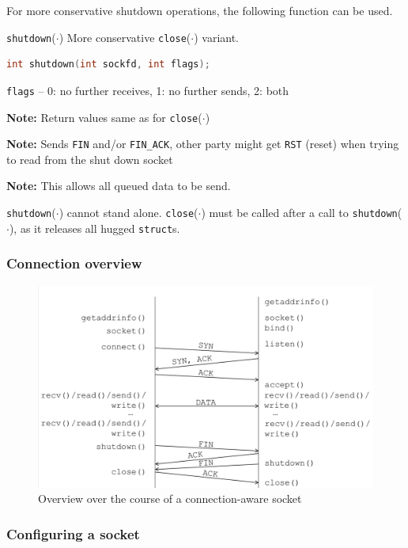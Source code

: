 \documentclass[english]{panikzettel}
\newcommand{\fkt}[1]{\texttt{#1}(\(\cdot\))}
\begin{document}
	For more conservative shutdown operations, the following function can be used.

	\begin{defi}{\fkt{shutdown}}
		More conservative \fkt{close} variant.
		\begin{lstlisting}[language=C]
			int shutdown(int sockfd, int flags);
		\end{lstlisting}
		\tcblower
		\texttt{flags} – 0: no further receives, 1: no further sends, 2: both

		\textbf{Note:} Return values same as for \fkt{close}

		\textbf{Note:} Sends \texttt{FIN} and/or \texttt{FIN\_ACK}, other party might get \texttt{RST} (reset) when trying to read from the shut down socket

		\textbf{Note:} This allows all queued data to be send.
	\end{defi}

	\fkt{shutdown} cannot stand alone. 
	\fkt{close} must be called after a call to \fkt{shutdown}, as it releases all hugged \texttt{struct}s.

	\subsubsection{Connection overview}

	\begin{figure}[H]
		\centering
		\includegraphics[width=\textwidth]{img/1-connection-overview.png}
		\caption{Overview over the course of a connection-aware socket}
		\label{img-1-connection-overview}
	\end{figure}

	\subsubsection{Configuring a socket}
\end{document}
